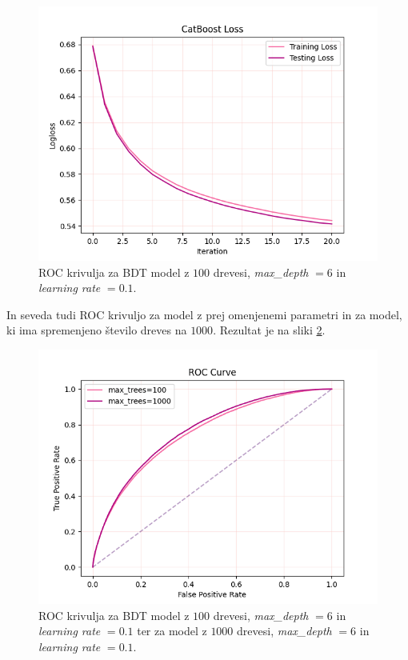 \documentclass[a4paper]{article}
\begin{document}
\begin{figure}[H]
    \centering
    \includegraphics[width=1\textwidth]{../images/catboost_loss.png}
    \caption{ROC krivulja za BDT model z $100$ drevesi, \textit{max\_depth} $= 6$ in \textit{learning rate} $= 0.1$.}
    \label{fig:BDT_ROC}
\end{figure}

In seveda tudi ROC krivuljo za model z prej omenjenemi parametri in za model, ki ima spremenjeno število dreves na $1000$. 
Rezultat je na sliki \ref{fig:BDT_ROC}. \\

\begin{figure}[H]
    \centering
    \includegraphics[width=1\textwidth]{../images/catboost_roc.png}
    \caption{ROC krivulja za BDT model z $100$ drevesi, \textit{max\_depth} $= 6$ in \textit{learning rate} $= 0.1$ ter za 
    model z $1000$ drevesi, \textit{max\_depth} $= 6$ in \textit{learning rate} $= 0.1$.}
    \label{fig:BDT_ROC}
\end{figure}
\end{document}
